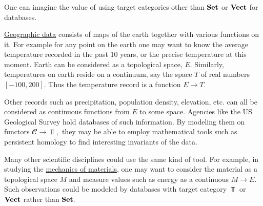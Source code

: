 \documentclass[../main/CT4S-EN-RU]{subfiles}
\begin{document}

\subsubsection{}\label{sec:other targets}

\begin{blockENG}
One can imagine the value of using target categories other than ${\mathbf{Set}}$ or ${\mathbf{Vect}}$ for databases. 
\end{blockENG}

\begin{blockRUS}
\end{blockRUS}

\begin{applicationENG}
\href{http://en.wikipedia.org/wiki/Geographic_data}{\text Geographic data} consists of maps of the earth together with various functions on it. For example for any point on the earth one may want to know the average temperature recorded in the past 10 years, or the precise temperature at this moment. Earth can be considered as a topological space, $E.$ Similarly, temperatures on earth reside on a continuum, say the space $T$ of real numbers $[-100,200].$ Thus the temperature record is a function $E{→} T.$ 

Other records such as precipitation, population density, elevation, etc. can all be considered as continuous functions from $E$ to some space. Agencies like the US Geological Survey hold databases of such information. By modeling them on functors ${𝓒}{→}\Top,$ they may be able to employ mathematical tools such as persistent homology \cite{WeS} to find interesting invariants of the data.
\end{applicationENG}

\begin{applicationRUS}
\end{applicationRUS}

\begin{applicationENG}
Many other scientific disciplines could use the same kind of tool. For example, in studying the \href{http://en.wikipedia.org/wiki/Strength_of_materials}{\text mechanics of materials}, one may want to consider the material as a topological space $M$ and measure values such as energy as a continuous $M{→} E.$ Such observations could be modeled by databases with target category $\Top$ or ${\mathbf{Vect}}$ rather than ${\mathbf{Set}}.$
\end{applicationENG}
\end{document}
